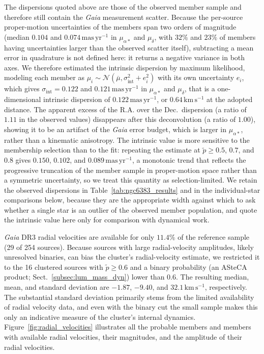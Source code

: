 \documentclass{aa}
\begin{document}
The dispersions quoted above are those of the observed member sample and therefore still contain the \textit{Gaia} measurement scatter. Because the per-source proper-motion uncertainties of the members span two orders of magnitude (median $0.104$ and $0.074\,\mathrm{mas\,yr^{-1}}$ in $\mu_{\alpha*}$ and $\mu_\delta$, with $32\%$ and $23\%$ of members having uncertainties larger than the observed scatter itself), subtracting a mean error in quadrature is not defined here: it returns a negative variance in both axes. We therefore estimated the intrinsic dispersion by maximum likelihood, modeling each member as $\mu_i \sim \mathcal{N}(\overline{\mu}, \sigma_{\mathrm{int}}^2 + e_i^2)$ with its own uncertainty $e_i$, which gives $\sigma_{\mathrm{int}} = 0.122$ and $0.121\,\mathrm{mas\,yr^{-1}}$ in $\mu_{\alpha*}$ and $\mu_\delta$, that is a one-dimensional intrinsic dispersion of $0.122\,\mathrm{mas\,yr^{-1}}$, or $0.64\,\mathrm{km\,s^{-1}}$ at the adopted distance. The apparent excess of the R.A. over the Dec.\ dispersion (a ratio of $1.11$ in the observed values) disappears after this deconvolution (a ratio of $1.00$), showing it to be an artifact of the \textit{Gaia} error budget, which is larger in $\mu_{\alpha*}$, rather than a kinematic anisotropy. The intrinsic value is more sensitive to the membership selection than to the fit: repeating the estimate at $\tilde{p}\geq0.5$, $0.7$, and $0.8$ gives $0.150$, $0.102$, and $0.089\,\mathrm{mas\,yr^{-1}}$, a monotonic trend that reflects the progressive truncation of the member sample in proper-motion space rather than a symmetric uncertainty, so we treat this quantity as selection-limited. We retain the observed dispersions in Table~\ref{tab:ngc6383_results} and in the individual-star comparisons below, because they are the appropriate width against which to ask whether a single star is an outlier of the observed member population, and quote the intrinsic value here only for comparison with dynamical work.

\textit{Gaia} DR3 radial velocities are available for only $11.4$\% of the reference sample (29 of 254 sources). Because sources with large radial-velocity amplitudes, likely unresolved binaries, can bias the cluster's radial-velocity estimate, we restricted it to the 16 clustered sources with $\tilde{p}\geq0.6$ and a binary probability (an ASteCA product; Sect.~\ref{subsec:lum_mass_dyn}) lower than $0.6$. The resulting median, mean, and standard deviation are $-1.87$, $-9.40$, and $32.1\,\mathrm{km\,s^{-1}}$, respectively. The substantial standard deviation primarily stems from the limited availability of radial velocity data, and even with the binary cut the small sample makes this only an indicative measure of the cluster's internal dynamics. Figure~\ref{fig:radial_velocities} illustrates all the probable members and members with available radial velocities, their magnitudes, and the amplitude of their radial velocities.
\end{document}
